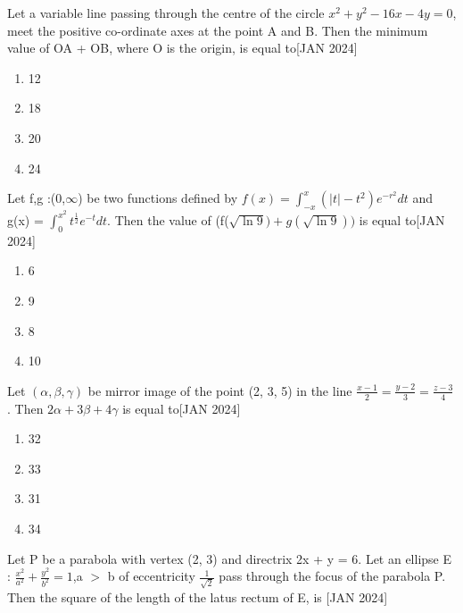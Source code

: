     \item Let a variable line passing through the centre of the circle $x^2  + y^2 - 16x - 4y = 0$, meet the positive co-ordinate axes at the point A and B. Then the minimum value of OA + OB, where O is the origin, is equal to\hfill{[JAN 2024]}
    \begin{multicols}{4}
    \begin{enumerate}
        \item 12
        \item 18
        \item 20
        \item 24
    \end{enumerate} 
    \end{multicols}
    \bigskip
    \item Let f,g :(0,$\infty$) be two functions defined by $f(x) = \int_{-x}^{x}(|t| - t^2)e^{-r^{2}}dt$ and g(x) = $\int_{0}^{x^2}t^{\frac{1}{2}}e^{-t}dt$. Then the value of (f($\sqrt{\ln9}) + g(\sqrt{\ln9}))$ is equal to\hfill{[JAN 2024]}
    \begin{multicols}{4}
    \begin{enumerate}
        \item 6
        \item 9
        \item 8
        \item 10
    \end{enumerate} 
    \end{multicols}
    \bigskip
    \item Let $(\alpha,\beta,\gamma)$  be mirror image of the point (2, 3, 5) in the line $\frac{x - 1}{2} = \frac{y - 2}{3} = \frac{z - 3}{4}$. Then $2\alpha + 3\beta + 4\gamma$ is equal to\hfill{[JAN 2024]}
    \begin{multicols}{4}
    \begin{enumerate}
        \item 32
        \item 33
        \item 31
        \item 34
    \end{enumerate} 
    \end{multicols}
    \bigskip
    \item Let P be a parabola with vertex (2, 3) and directrix 2x + y = 6. Let an ellipse E : $\frac{x^2}{a^2} + \frac{y^2}{b^2} = 1$,a $>$ b of eccentricity $\frac{1}{\sqrt{2}}$ pass through the focus of the parabola P. Then the square of the length of the latus rectum of E, is  \hfill{[JAN 2024]}
